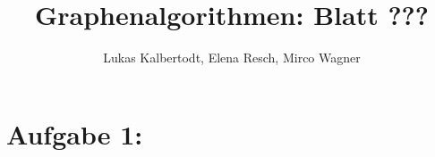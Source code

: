 \documentclass[11pt]{scrartcl}  %
\title{Graphenalgorithmen: Blatt ???}
\author{Lukas Kalbertodt, Elena Resch, Mirco Wagner}
\begin{document}
\maketitle


\section*{Aufgabe 1:}
\end{document}

